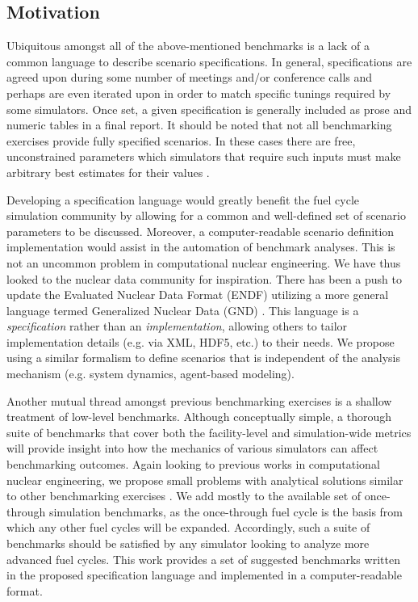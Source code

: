 \documentclass{anstrans}
\begin{document}
\subsection{Motivation}
Ubiquitous amongst all of the above-mentioned benchmarks is a lack of a common
language to describe scenario specifications. In general, specifications are
agreed upon during some number of meetings and/or conference calls and perhaps
are even iterated upon in order to match specific tunings required by some
simulators. Once set, a given specification is generally included as prose and
numeric tables in a final report. It should be noted that not all benchmarking
exercises provide fully specified scenarios. In these cases there are free, 
unconstrained parameters which simulators that require such inputs must make
arbitrary best estimates for their values \cite{scopatz_fuel_2011}.

Developing a specification language would greatly benefit the fuel cycle
simulation community by allowing for a common and well-defined set of scenario
parameters to be discussed. Moreover, a computer-readable scenario definition
implementation would assist in the automation of benchmark analyses. This is not
an uncommon problem in computational nuclear engineering. We have thus looked to
the nuclear data community for inspiration.  There has been a push to update the
Evaluated Nuclear Data Format (ENDF) utilizing a more general language termed
Generalized Nuclear Data (GND) \cite{mattoon_generalized_2012}. This language is
a \emph{specification} rather than an \emph{implementation}, allowing others to
tailor implementation details (e.g. via XML, HDF5, etc.) to their needs. We
propose using a similar formalism to define scenarios that is independent of the
analysis mechanism (e.g. system dynamics, agent-based modeling).

Another mutual thread amongst previous benchmarking exercises is a shallow
treatment of low-level benchmarks. Although conceptually simple, a thorough
suite of benchmarks that cover both the facility-level and simulation-wide
metrics will provide insight into how the mechanics of various simulators can
affect benchmarking outcomes. Again looking to previous works in computational
nuclear engineering, we propose small problems with analytical solutions similar
to other benchmarking exercises \cite{wagner_mcnp:_1992}. We add mostly to the
available set of once-through simulation benchmarks, as the once-through fuel
cycle is the basis from which any other fuel cycles will be expanded.
Accordingly, such a suite of benchmarks should be satisfied by any simulator
looking to analyze more advanced fuel cycles. This work provides a set of
suggested benchmarks written in the proposed specification language and
implemented in a computer-readable format.
\end{document}
